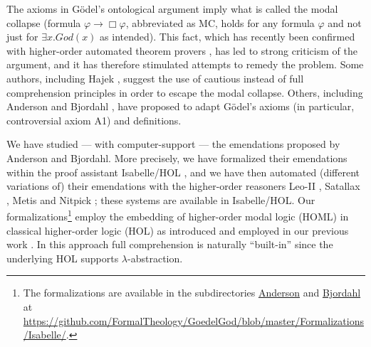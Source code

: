 \documentclass{birkjour}
\theoremstyle{definition}
\theoremstyle{remark}
\numberwithin{equation}{section}
\begin{document}

\maketitle


The axioms in G\"odel's ontological argument
\cite{GoedelNotes,ScottNotes} imply what is called the modal collapse
\cite{Sobel1987,SobelBook} (formula $\varphi \rightarrow \Box
\varphi$, abbreviated as MC, holds for any formula $\varphi$ and not
just for $\exists x. God(x)$ as intended). This fact, which has
recently been confirmed with higher-order automated theorem provers
\cite{J30,ECAI-2014}, has led to strong criticism of the argument, and
it has therefore stimulated attempts to remedy the problem. Some
authors, including Hajek
\cite{Hajek_der_Mathematiker,Hajek_Magari_and_others}, suggest the use
of cautious instead of full comprehension principles in order to
escape the modal collapse. Others, including Anderson
\cite{anderson90:_some_emend_of_goedel_ontol_proof,AndersonGettings}
and Bjordahl \cite{}, have proposed to adapt G\"odel's axioms (in
particular, controversial axiom A1) and definitions.

We have studied --- with computer-support --- the emendations proposed
by Anderson and Bjordahl.  More precisely, we have formalized their
emendations within the proof assistant Isabelle/HOL \cite{Isabelle},
and we have then automated (different variations of) their emendations
with the higher-order reasoners Leo-II \cite{}, Satallax \cite{},
Metis \cite{} and Nitpick \cite{}; these systems are available in
Isabelle/HOL.  Our formalizations\footnote{The formalizations are
  available in the subdirectories \url{Anderson} and \url{Bjordahl} at
  \url{https://github.com/FormalTheology/GoedelGod/blob/master/Formalizations/Isabelle/}.}
employ the embedding of higher-order modal logic (HOML) in classical
higher-order logic (HOL) as introduced and employed in our previous
work \cite{J30,ECAI-2014}. In this approach full comprehension is
naturally ``built-in'' since the underlying HOL supports
$\lambda$-abstraction.
\end{document}
